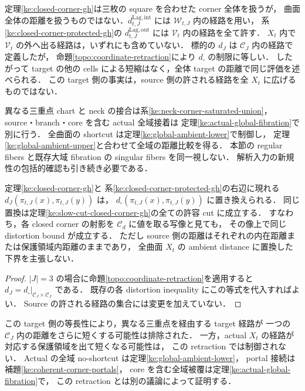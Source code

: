 \begin{remark}
\label{ke:closed-corner-gh-scope}
定理\ref{ke:closed-corner-gh}は三枚の square を合わせた corner 全体を扱うが，
曲面全体の距離を扱うものではない．$d_{t,J}^{\mathrm{Lag,int}}$ には
$\mathcal W_{t,J}$ 内の経路を用い，
系\ref{ke:closed-corner-protected-gh}の $d_{t,J}^{\mathrm{Lag,out}}$ には
$\mathcal V_t$ 内の経路を全て許す．
$X_t$ 内で $\mathcal V_t$ の外へ出る経路は，いずれにも含めていない．
標的の $d_J$ は $\mathcal C_J$ 内の経路で定義したが，
命題\ref{topo:coordinate-retraction}により $d_\square$ の制限に等しい．
したがって target の他の cells による短縮はなく，全体 target の距離で同じ評価を述べられる．
この target 側の事実は，source 側の許される経路を全 $X_t$ に広げるものではない．

異なる三重点 chart と neck の接合は系\ref{ke:neck-corner-saturated-union}，
source・branch・core を含む actual 全域接着は
定理\ref{ke:actual-global-fibration}で別に行う．
全曲面の shortcut は定理\ref{ke:global-ambient-lower}で制御し，
定理\ref{ke:global-ambient-upper}と合わせて全域の距離比較を得る．
本節の regular fibers と既存大域 fibration の singular fibers を同一視しない．
解析入力の新規性の包括的確認も引き続き必要である．
\end{remark}

\begin{corollary}
\label{ke:closed-corner-global-target}
定理\ref{ke:closed-corner-gh}と
系\ref{ke:closed-corner-protected-gh}の右辺に現れる
$d_J(\pi_{t,J}(x),\pi_{t,J}(y))$ は，
$d_\square(\pi_{t,J}(x),\pi_{t,J}(y))$ に置き換えられる．
同じ置換は定理\ref{ke:slow-cut-closed-corner-gh}の全ての許容 cut に成立する．
すなわち，各 closed corner の射影を $\mathcal C_d$ に値を取る写像と見ても，
その像上で同じ distortion bound が成立する．
ただし source 側の距離はそれぞれの内在距離または保護領域内距離のままであり，
全曲面 $X_t$ の ambient distance に置換した下界を主張しない．
\end{corollary}
\begin{proof}
$|J|=3$ の場合に命題\ref{topo:coordinate-retraction}を適用すると
$d_J=d_\square|_{\mathcal C_J\times\mathcal C_J}$ である．
既存の各 distortion inequality にこの等式を代入すればよい．
Source の許される経路の集合には変更を加えていない．
\end{proof}

\begin{remark}
この target 側の等長性により，異なる三重点を経由する target 経路が
一つの $\mathcal C_J$ 内の距離をさらに短くする可能性は排除された．
一方，actual $X_t$ の経路が対応する保護領域を出て短くなる可能性は，
この retraction では制御されない．
Actual の全域 no-shortcut は定理\ref{ke:global-ambient-lower}，
portal 接続は補題\ref{ke:coherent-corner-portals}，
core を含む全域被覆は定理\ref{ke:actual-global-fibration}で，
この retraction とは別の議論によって証明する．
\end{remark}


